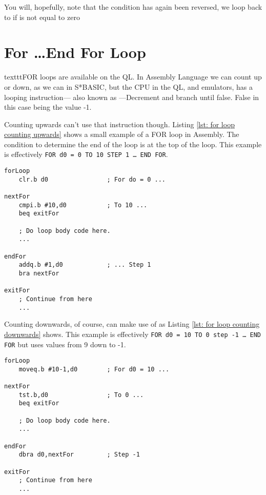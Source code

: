 You will, hopefully, note that the condition has again been reversed, we loop back to  if  is not equal to zero

\section{For \ldots\protect End For Loop}

texttt{FOR} loops are available on the QL. In Assembly Language we can count up or down, as we can in S*BASIC, but the CPU in the QL, and emulators, has a looping instruction--- also known as ---Decrement  and branch until false. False in this case being the value -1.

Counting upwards can't use that instruction though. Listing \ref{lst: for loop counting upwards} shows a small example of a FOR loop in Assembly. The condition to determine the end of the loop is at the top of the loop. This example is effectively \texttt{FOR d0 = 0 TO 10 STEP 1 \ldots{} END FOR}.

\begin{lstlisting}[caption={For loop - counting upwards},label={lst: for loop counting upwards}]
forLoop
    clr.b d0                ; For do = 0 ...
    
nextFor
    cmpi.b #10,d0           ; To 10 ...
    beq exitFor
    
    ; Do loop body code here.
    ...

endFor
    addq.b #1,d0            ; ... Step 1
    bra nextFor

exitFor
    ; Continue from here
    ...
\end{lstlisting}

Counting downwards, of course, can make use of  as Listing \ref{lst: for loop counting downwards} shows. This example is effectively \texttt{FOR d0 = 10 TO 0 step -1 \ldots{} END FOR} but uses values from 9 down to -1.

\begin{lstlisting}[caption={For loop - counting downwards},label={lst: for loop counting downwards}]
forLoop
    moveq.b #10-1,d0        ; For d0 = 10 ...
    
nextFor
    tst.b,d0                ; To 0 ...
    beq exitFor
    
    ; Do loop body code here.
    ...
    
endFor
    dbra d0,nextFor         ; Step -1
    
exitFor
    ; Continue from here
    ...
\end{lstlisting}

